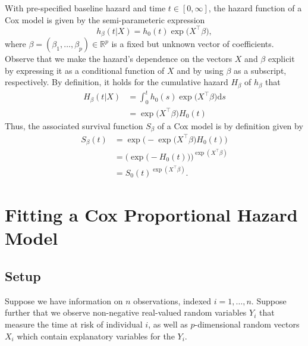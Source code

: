 \documentclass[11pt]{article}
\newcommand{\R}{\mathbb{R}}
\renewcommand{\d}{\text{d}}
\begin{document}
With pre-specified baseline hazard and time $t \in[0,\infty]$, the hazard function of a Cox model is given by the semi-parameteric expression
\begin{equation}\label{eq:cox-hazard}
    h_\beta(t | X) = h_0(t) \exp \big( X^\top \beta \big),
\end{equation}
where $\beta = (\beta_1,\dots,\beta_p)\in\R^p$ is a fixed but unknown vector of coefficients. Observe that we make the hazard's dependence on the vectors $X$ and $\beta$ explicit by expressing it as a conditional function of $X$ and by using $\beta$ as a subscript, respectively. By definition, it holds for the cumulative hazard $H_\beta$ of $h_\beta$ that
\begin{equation*}
\begin{split}
    H_\beta(t|X) &= \int^t_0 h_0(s) \exp \big(X^\top \beta \big) \d s
    \\
    &= \exp \big(X^\top \beta \big) H_0(t)
\end{split}
\end{equation*}
Thus, the associated survival function $S_\beta$ of a Cox model is by definition given by
\begin{equation} \label{eq:cox-survival}
\begin{split}
    S_\beta(t) 
    &=
    \exp\Big( - \exp\big( X^\top \beta \big) H_0(t)  \Big)
    \\&=
    \Big(\exp\big( - H_0(t) \big) \Big)^{\exp(X^\top \beta)}
    \\&=
    S_0(t)^{\exp(X^\top \beta)}.
\end{split}
\end{equation}

\section{Fitting a Cox Proportional Hazard Model}
\subsection{Setup}
Suppose we have information on $n$ observations, indexed $i=1,\dots,n$. Suppose further that we observe non-negative real-valued random variables $Y_i$ that measure the time at risk of individual $i$, as well as $p$-dimensional random vectors $X_i$ which contain explanatory variables for the $Y_i$. 
\end{document}
